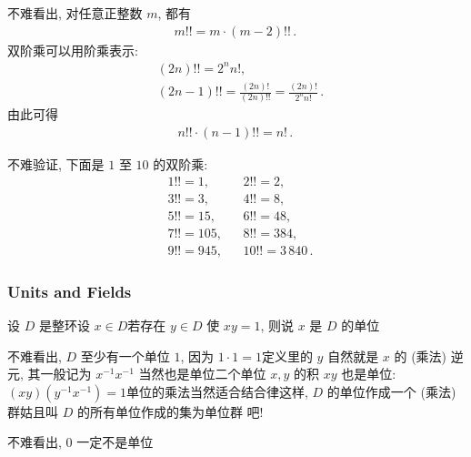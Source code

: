 \begin{remark}
    不难看出, 对任意正整数 $m$, 都有
    \begin{align*}
        m!! = m \cdot (m-2)!! \period
    \end{align*}
    双阶乘可以用阶乘表示:
    \begin{align*}
         & (2n)!! = 2^n n!,                                               \\
         & (2n-1)!! = \frac{(2n)!}{(2n)!!} = \frac{(2n)!}{2^n n!} \period
    \end{align*}
    由此可得
    \begin{align*}
        n!! \cdot (n-1)!! = n! \period
    \end{align*}
\end{remark}

\begin{example}
    不难验证, 下面是 $1$ 至 $10$ 的双阶乘:
    \begin{align*}
         & 1!! = 1,   &  & 2!! = 2,              \\
         & 3!! = 3,   &  & 4!! = 8,              \\
         & 5!! = 15,  &  & 6!! = 48,             \\
         & 7!! = 105, &  & 8!! = 384,            \\
         & 9!! = 945, &  & 10!! = 3\,840 \period
    \end{align*}
\end{example}

\subsubsection*{Units and Fields}

\begin{definition}
    设 $D$ 是整环\period 设 $x \in D$\period 若存在 $y \in D$ 使 $xy=1$, 则说 $x$ 是 $D$ 的单位 \period
\end{definition}

\begin{remark}
    不难看出, $D$ 至少有一个单位 $1$, 因为 $1 \cdot 1 = 1$\period 定义里的 $y$ 自然就是 $x$ 的 (乘法) 逆元, 其一般记为 $x^{-1}$\period $x^{-1}$ 当然也是单位\period 二个单位 $x,y$ 的积 $xy$ 也是单位: $(xy)(y^{-1}x^{-1})=1$\period 单位的乘法当然适合结合律\period 这样, $D$ 的单位作成一个 (乘法) 群\period 姑且叫 $D$ 的所有单位作成的集为单位群  吧!
\end{remark}

\begin{remark}
    不难看出, $0$ 一定不是单位\period
\end{remark}

